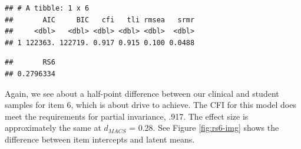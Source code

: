 \documentclass[
  man]{apa7}
\newenvironment{Shaded}{\begin{snugshade}}{\end{snugshade}}
\newcommand{\AttributeTok}[1]{\textcolor[rgb]{0.13,0.29,0.53}{#1}}
\newcommand{\CommentTok}[1]{\textcolor[rgb]{0.56,0.35,0.01}{\textit{#1}}}
\newcommand{\DecValTok}[1]{\textcolor[rgb]{0.00,0.00,0.81}{#1}}
\newcommand{\FloatTok}[1]{\textcolor[rgb]{0.00,0.00,0.81}{#1}}
\newcommand{\FunctionTok}[1]{\textcolor[rgb]{0.13,0.29,0.53}{\textbf{#1}}}
\newcommand{\NormalTok}[1]{#1}
\newcommand{\SpecialCharTok}[1]{\textcolor[rgb]{0.81,0.36,0.00}{\textbf{#1}}}
\newcommand{\StringTok}[1]{\textcolor[rgb]{0.31,0.60,0.02}{#1}}
\begin{document}
\normalsize

\begin{verbatim}
## # A tibble: 1 x 6
##       AIC     BIC   cfi   tli rmsea   srmr
##     <dbl>   <dbl> <dbl> <dbl> <dbl>  <dbl>
## 1 122363. 122719. 0.917 0.915 0.100 0.0488
\end{verbatim}

\small

\begin{Shaded}
\end{Shaded}

\normalsize

\begin{verbatim}
##       RS6 
## 0.2796334
\end{verbatim}

Again, we see about a half-point difference between our clinical and student samples for item 6, which is about drive to achieve. The CFI for this model does meet the requirements for partial invariance, .917. The effect size is approximately the same at \(d_{MACS}\) = 0.28. See Figure \ref{fig:rs6-img} shows the difference between item intercepts and latent means.

\normalsize

\begin{Shaded}
\end{Shaded}
\end{document}

